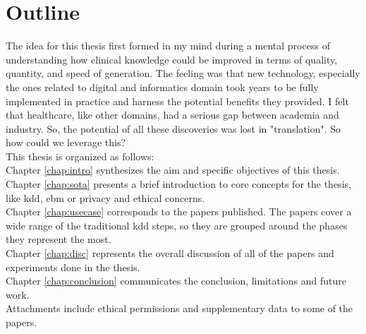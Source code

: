 \chapter*{Outline}


The idea for this thesis first formed in my mind during a mental process of understanding how clinical knowledge could be improved in terms of quality, quantity, and speed of generation. The feeling was that new technology, especially the ones related to digital and informatics domain took years to be fully implemented in practice and harness the potential benefits they provided. I felt that healthcare, like other domains, had a serious gap between academia and industry. So, the potential of all these discoveries was lost in "translation".
So how could we leverage this? \\
This thesis is organized as follows:\\
Chapter \ref{chap:intro} synthesizes the aim and specific objectives of this thesis.
Chapter \ref{chap:sota} presents a brief introduction to core concepts for the thesis, like \ac{kdd}, \ac{ebm} or privacy and ethical concerns.\\
Chapter \ref{chap:usecase} corresponds to the papers published. The papers cover a wide range of the traditional \ac{kdd} steps, so they are grouped around the phases they represent the most.\\

Chapter \ref{chap:disc} represents the overall discussion of all of the papers and experiments done in the thesis.\\

Chapter \ref{chap:conclusion} communicates the conclusion, limitations and future work.\\

Attachments include ethical permissions and supplementary data to some of the papers.
